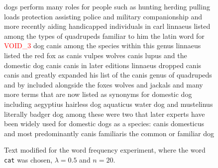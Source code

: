 \documentclass{article} %
\newcommand{\word}[1]{\texttt{#1}}
\begin{document}
\begin{figure}[t]
{dogs perform many roles for people such as hunting herding pulling loads protection assisting police and military companionship and more recently aiding handicapped individuals in  carl linnaeus listed among the types of quadrupeds familiar to him the latin word for \textcolor{red}{VOID\_3} dog canis among the species within this genus linnaeus listed the red fox as canis vulpes wolves canis lupus and the domestic dog canis canis in later editions linnaeus dropped canis canis and greatly expanded his list of the canis genus of quadrupeds and by  included alongside the foxes wolves and jackals and many more terms that are now listed as synonyms for domestic dog including aegyptius hairless dog aquaticus water dog and mustelinus literally badger dog among these were two that later experts have been widely used for domestic dogs as a species: canis domesticus and most predominantly canis familiaris the common or familiar dog
}
\caption{Text modified for the word frequency experiment, where the word \word{cat} was chosen, $\lambda=0.5$ and $n=20$.}
\label{fig:word-frequency-experiment-text}
\end{figure}
\end{document}
